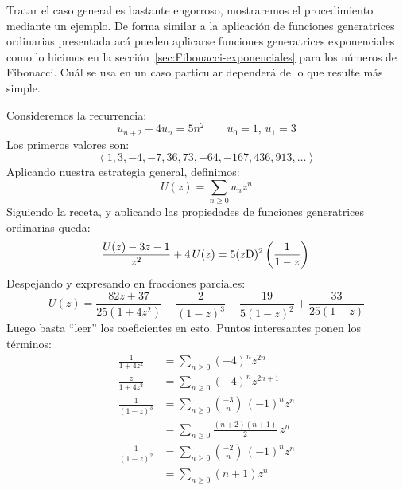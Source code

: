   Tratar el caso general es bastante engorroso,
  mostraremos el procedimiento mediante un ejemplo.
  De forma similar a la aplicación de funciones generatrices ordinarias
  presentada acá
  pueden aplicarse funciones generatrices exponenciales
  como lo hicimos en la sección~\ref{sec:Fibonacci-exponenciales}
  para los números de Fibonacci.
  Cuál se usa en un caso particular
  dependerá de lo que resulte más simple.

  Consideremos la recurrencia:
  \begin{equation*}
    u_{n + 2} + 4 u_n = 5 n^2 \qquad \text{\(u_0 = 1\), \(u_1 = 3\)}
  \end{equation*}
  Los primeros valores son:
  \begin{equation*}
    \left\langle
      1, 3, -4, -7, 36, 73, -64, -167, 436, 913, \dotsc
    \right\rangle
  \end{equation*}
  Aplicando nuestra estrategia general,
  definimos:
  \begin{equation*}
    U(z) = \sum_{n \ge 0} u_n z^n
  \end{equation*}
  Siguiendo la receta,
  y aplicando las propiedades de funciones generatrices ordinarias queda:
  \begin{equation*}
    \frac{U(z) - 3 z - 1}{z^2} + 4 \, U(z)
      = 5 (z \mathrm{D})^2 \left(\frac{1}{1 - z}\right) \\
  \end{equation*}
  Despejando y expresando en fracciones parciales:
  \begin{equation*}
    U(z)
      = \frac{82 z + 37}{25 (1 + 4 z^2)}
	  + \frac{2}{(1 - z)^3}
	  - \frac{19}{5 (1 - z)^2}
	  + \frac{33}{25 (1 - z)}
  \end{equation*}
  Luego basta ``leer'' los coeficientes en esto.
  Puntos interesantes ponen los términos:
  \begin{align*}
    \frac{1}{1 + 4 z^2}
      &= \sum_{n \ge 0} (-4)^n z^{2 n} \\
    \frac{z}{1 + 4 z^2}
      &= \sum_{n \ge 0} (-4)^n z^{2 n + 1} \\
    \frac{1}{(1 - z)^3}
      &= \sum_{n \ge 0} \binom{-3}{n} \, (-1)^n z^n \\
      &= \sum_{n \ge 0} \frac{(n + 2) (n + 1)}{2} \, z^n \\
    \frac{1}{(1 - z)^2}
      &= \sum_{n  \ge 0} \binom{-2}{n} \, (-1)^n z^n \\
      &= \sum_{n \ge 0} (n + 1) z^n
  \end{align*}
